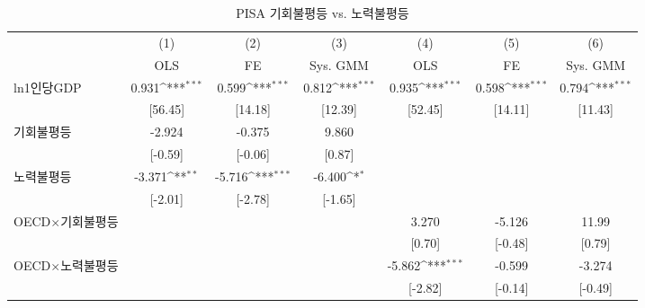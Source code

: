 \begin{table}[htbp]\centering
\def\sym#1{\ifmmode^{#1}\else\(^{#1}\)\fi}
\caption{PISA 기회불평등 vs. 노력불평등\label{tab:pisacomp}}
\begin{tabular}{l*{6}{c}}
\toprule
                    &\multicolumn{1}{c}{(1)}&\multicolumn{1}{c}{(2)}&\multicolumn{1}{c}{(3)}&\multicolumn{1}{c}{(4)}&\multicolumn{1}{c}{(5)}&\multicolumn{1}{c}{(6)}\\ &\multicolumn{1}{c}{OLS}&\multicolumn{1}{c}{FE}&\multicolumn{1}{c}{Sys. GMM}&\multicolumn{1}{c}{OLS}&\multicolumn{1}{c}{FE}&\multicolumn{1}{c}{Sys. GMM}\\
\midrule
ln1인당GDP        &       0.931\sym{***}&       0.599\sym{***}&       0.812\sym{***}&       0.935\sym{***}&       0.598\sym{***}&       0.794\sym{***}\\
                    &     [56.45]         &     [14.18]         &     [12.39]         &     [52.45]         &     [14.11]         &     [11.43]         \\
\addlinespace
기회불평등        &      -2.924         &      -0.375         &       9.860         &                     &                     &                     \\
                    &     [-0.59]         &     [-0.06]         &      [0.87]         &                     &                     &                     \\
\addlinespace
노력불평등        &      -3.371\sym{**} &      -5.716\sym{***}&      -6.400\sym{*}  &                     &                     &                     \\
                    &     [-2.01]         &     [-2.78]         &     [-1.65]         &                     &                     &                     \\
\addlinespace
OECD$\times$기회불평등&                     &                     &                     &       3.270         &      -5.126         &       11.99         \\
                    &                     &                     &                     &      [0.70]         &     [-0.48]         &      [0.79]         \\
\addlinespace
OECD$\times$노력불평등&                     &                     &                     &      -5.862\sym{***}&      -0.599         &      -3.274         \\
                    &                     &                     &                     &     [-2.82]         &     [-0.14]         &     [-0.49]         \\

\end{tabular}
\end{table}
